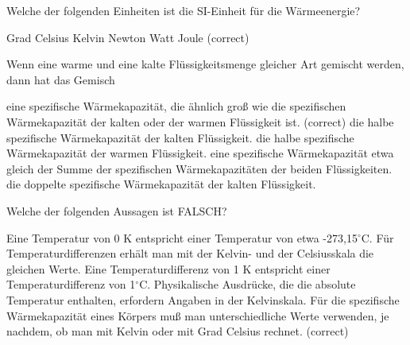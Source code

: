 \documentclass[11pt]{exam}
\begin{document}
\setlength{\voffset}{-0.5in}
\setlength{\headsep}{5pt}

\hspace{2mm}
 \hspace{5mm}
\vspace{4mm}

\begin{questions}

\question Welche der folgenden Einheiten ist die SI-Einheit für die Wärmeenergie?

\begin{choices}
	\choice Grad Celsius
	\choice Kelvin
	\choice Newton
	\choice Watt
	\choice Joule (correct)
\end{choices}

\vspace{3mm}\question Wenn eine warme und eine kalte Flüssigkeitsmenge gleicher Art gemischt werden, dann hat das Gemisch

\begin{choices}
	\choice eine spezifische Wärmekapazität, die ähnlich groß wie die spezifischen Wärmekapazität der kalten oder der warmen Flüssigkeit ist. (correct)
	\choice die halbe spezifische Wärmekapazität der kalten Flüssigkeit.
	\choice die halbe spezifische Wärmekapazität der warmen Flüssigkeit.
	\choice eine spezifische Wärmekapazität etwa gleich der Summe der spezifischen Wärmekapazitäten der beiden Flüssigkeiten.
	\choice die doppelte spezifische Wärmekapazität der kalten Flüssigkeit.
\end{choices}

\vspace{3mm}\question Welche der folgenden Aussagen ist FALSCH?

\begin{choices}
	\choice Eine Temperatur von 0 K entspricht einer Temperatur von etwa -273,15\(^\circ\)C.
	\choice Für Temperaturdifferenzen erhält man mit der Kelvin- und der Celsiusskala die gleichen Werte.
	\choice Eine Temperaturdifferenz von 1 K entspricht einer Temperaturdifferenz von 1\(^\circ\)C.
	\choice Physikalische Ausdrücke, die die absolute Temperatur enthalten, erfordern Angaben in der Kelvinskala.
	\choice Für die spezifische Wärmekapazität eines Körpers muß man unterschiedliche Werte verwenden, je nachdem, ob man mit Kelvin oder mit Grad Celsius rechnet. (correct)
\end{choices}


\end{questions}
\end{document}
